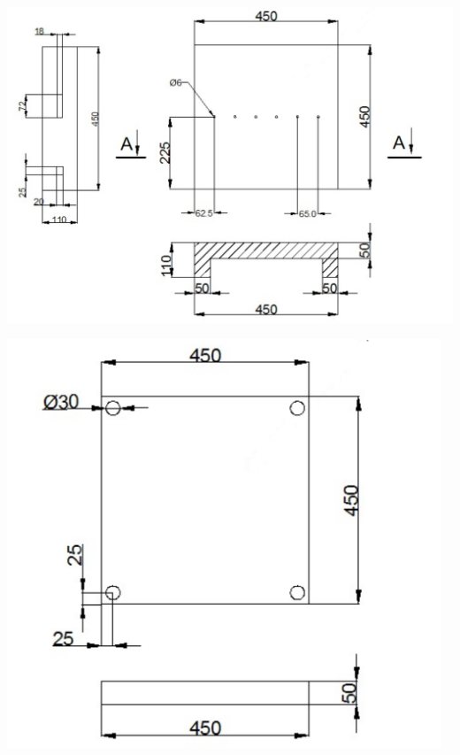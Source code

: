 	\begin{center}
		\includegraphics[width=170mm]{src/pictures/drawingp1.png}
	\end{center}
	\begin{center}
		\includegraphics[width=130mm]{src/pictures/drawingp2.png}
	\end{center}
